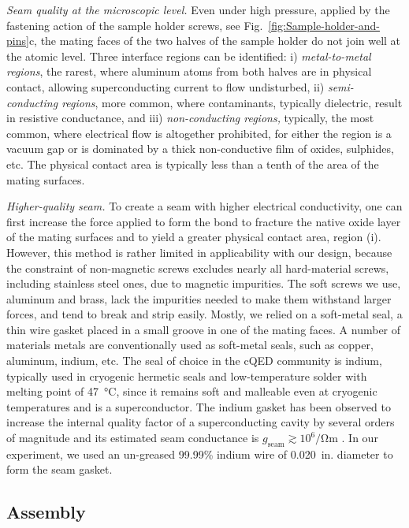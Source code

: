 \emph{Seam quality at the microscopic level.\label{disc:Seam-quality}
}Even under high pressure, applied by the fastening action of the
sample holder screws, see Fig.~\ref{fig:Sample-holder-and-pins}c,
the mating faces of the two halves of the sample holder do not join
well at the atomic level. Three interface regions can be identified:
i) \emph{metal-to-metal} \emph{regions}, the rarest, where aluminum
atoms from both halves are in physical contact, allowing superconducting
current to flow undisturbed, ii)\emph{ semi-conducting regions}, more
common, where contaminants, typically dielectric, result in resistive
conductance, and iii) \emph{non-conducting regions, }typically, the
most common, where electrical flow is altogether prohibited, for either
the region is a vacuum gap or is dominated by a thick non-conductive
film of oxides, sulphides, etc. The physical contact area is typically
less than a tenth of the area of the mating surfaces.

\emph{Higher-quality seam. }To create a seam with higher electrical
conductivity, one can first increase the force applied to form the
bond to fracture the native oxide layer of the mating surfaces and
to yield a greater physical contact area, region (i). However, this
method is rather limited in applicability with our design, because
the constraint of non-magnetic screws excludes nearly all hard-material
screws, including stainless steel ones, due to magnetic impurities.
The soft screws we use, aluminum and brass, lack the impurities needed
to make them withstand larger forces, and tend to break and strip
easily. Mostly, we relied on a soft-metal seal, a thin wire gasket
placed in a small groove in one of the mating faces. A number of materials
metals are conventionally used as soft-metal seals, such as copper,
aluminum, indium, etc. The seal of choice in the cQED community is
indium, typically used in cryogenic hermetic seals and low-temperature
solder with melting point of 47~°C, since it remains soft and malleable
even at cryogenic temperatures and is a superconductor. The indium
gasket has been observed to increase the internal quality factor of
a superconducting cavity by several orders of magnitude and its estimated
seam conductance is $g_{\mathrm{seam}}\gtrsim10^{6}/\mathrm{\Omega m}$
\citep{Brecht2017-Thesis}. In our experiment, we used an un-greased
99.99\% indium wire of 0.020~in. diameter to form the seam gasket.

\subsection{Assembly}

